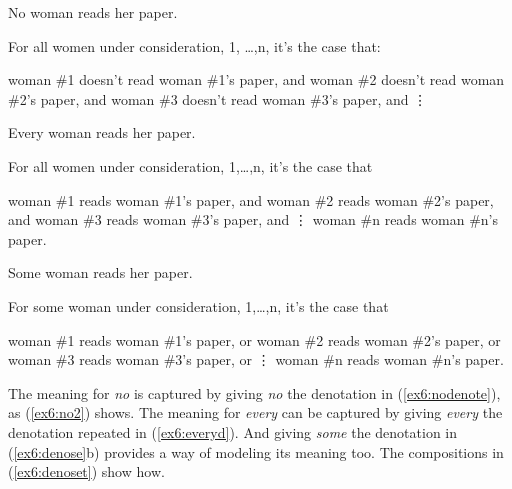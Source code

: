 \begin{exe}
	\raggedright
	\ex \label{ex6:dano} No woman reads her paper.
	\begin{xlist}
		\sn For all women under consideration, 1, \ldots,n, it's the case that:
		\begin{xlist}
			\ex woman \#1 doesn't read woman \#1's paper, and
			\ex woman \#2 doesn't read woman \#2's paper, and
			\ex woman \#3 doesn't read woman \#3's paper, and
			\sn \hspace*{1in}\vdots
		\end{xlist}
	\end{xlist}
	\ex \label{ex6:daevery} Every woman reads her paper.
	\begin{xlist}
		\sn For all women under consideration, 1,\ldots,n, it's the case that
		\begin{xlist}
			\ex woman \#1 reads woman \#1's paper, and
			\ex woman \#2 reads woman \#2's paper, and
			\ex woman \#3 reads woman \#3's paper, and
			\sn \hspace*{1in}\vdots
			\ex woman \#n reads woman \#n's paper.
		\end{xlist}
		\end{xlist}
		\ex \label{ex6:dasome} Some woman reads her paper.
		\begin{xlist}
			\sn For some woman under consideration, 1,\ldots,n, it's the case that
		\begin{xlist}
			\ex woman \#1 reads woman \#1's paper, or
			\ex woman \#2 reads woman \#2's paper, or
			\ex woman \#3 reads woman \#3's paper, or
			\sn \hspace*{1in}\vdots
			\ex woman \#n reads woman \#n's paper.
		\end{xlist}
	\end{xlist}
\end{exe}
The meaning for \emph{no} is captured by giving \emph{no} the denotation in (\ref{ex6:nodenote}), as (\ref{ex6:no2}) shows. The meaning for \emph{every} can be captured by giving \emph{every} the denotation repeated in (\ref{ex6:everyd}). And giving \emph{some} the denotation in (\ref{ex6:denose}b) provides a way of modeling its meaning too. The compositions in (\ref{ex6:denoset}) show how.
\medskip
